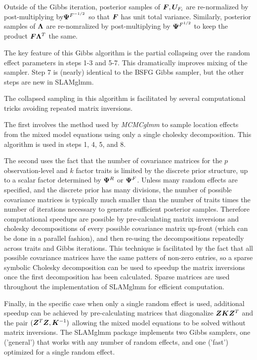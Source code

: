 \documentclass[11pt]{amsart}
\newcommand*{\B}[1]{\ifmmode\bm{#1}\else\textbf{#1}\fi}
\begin{document}
Outside of the Gibbs iteration, posterior samples of $\B{F}, \B{U}_{F_i}$ are re-normalized by post-multiplying by$\B{\Psi}^{F^{-1/2}}$ so that $\B{F}$ has unit total variance. Similarly, posterior samples of $\B{\Lambda}$ are re-nomralized by post-multiplying by $\B{\Psi}^{F^{1/2}}$ to keep the product $\B{F\Lambda}^T$ the same.


The key feature of this Gibbs algorithm is the partial collapsing over the random effect parameters in steps 1-3 and 5-7. This dramatically improves mixing of the sampler. Step 7 is (nearly) identical to the BSFG Gibbs sampler, but the other steps are new in SLAMglmm.

The collapsed sampling in this algorithm is facilitated by several computational tricks avoiding repeated matrix inversions. 

The first involves the method used by \emph{MCMCglmm} to sample location effects from the mixed model equations using only a single cholesky decomposition. This algorithm is used in steps 1, 4, 5, and 8.

The second uses the fact that the number of covariance matrices for the $p$ observation-level and $k$ factor traits is limited by the discrete prior structure, up to a scalar factor determined by $\B{\Psi}^R$ or $\B{\Psi}^F$. Unless many random effects are specified, and the discrete prior has many divisions, the number of possible covariance matrices is typically much smaller than the  number of traits times the number of iterations necessary to generate sufficient posterior samples. Therefore computational speedups are possible by pre-calculating matrix inversions and cholesky decompositions of every possible covariance matrix up-front (which can be done in a parallel fashion), and then re-using the decompositions repeatedly across traits and Gibbs iterations.
This technique is facilitated by the fact that all possible covariance matrices have the same patters of non-zero entries, so a sparse symbolic Cholesky decomposition can be used to speedup the matrix inversions once the first decomposition has been calculated. Sparse matrices are used throughout the implementation of SLAMglmm for efficient computation.

Finally, in the specific case when only a single random effect is used, additional speedup can be achieved by pre-calculating matrices that diagonalize $\B{ZKZ}^T$ and the pair $(\B{Z}^T\B{Z}, \B{K}^{-1})$ allowing the mixed model equations to be solved without matrix inversions. The SLAMglmm package implements two Gibbs samplers, one ('general') that works with any number of random effects, and one ('fast') optimized for a single random effect.
\end{document}

